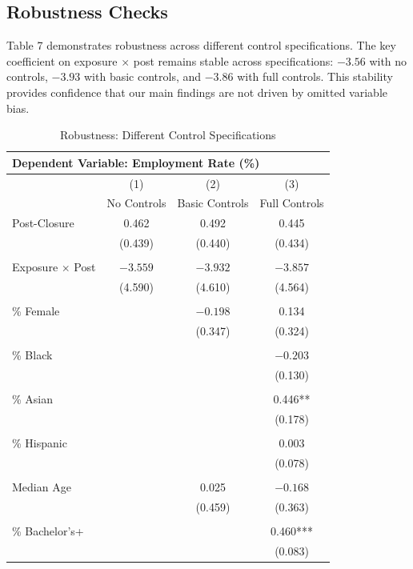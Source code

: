 \documentclass[12pt]{article}
\begin{document}
\clearpage

\subsection{Robustness Checks}

Table 7 demonstrates robustness across different control specifications. The key coefficient on exposure $\times$ post remains stable across specifications: $-3.56$ with no controls, $-3.93$ with basic controls, and $-3.86$ with full controls. This stability provides confidence that our main findings are not driven by omitted variable bias.

\begin{table}[H]
\centering
\caption{Robustness: Different Control Specifications}
\label{tab:robust}
\small
\begin{tabular}{lccc}
\toprule
\multicolumn{4}{l}{Dependent Variable: Employment Rate (\%)} \\
\midrule
& (1) & (2) & (3) \\
& No Controls & Basic Controls & Full Controls \\
\midrule
Post-Closure & 0.462 & 0.492 & 0.445 \\
& (0.439) & (0.440) & (0.434) \\
& & & \\
Exposure $\times$ Post & $-3.559$ & $-3.932$ & $-3.857$ \\
& (4.590) & (4.610) & (4.564) \\
& & & \\
\% Female & & $-0.198$ & 0.134 \\
& & (0.347) & (0.324) \\
& & & \\
\% Black & & & $-0.203$ \\
& & & (0.130) \\
& & & \\
\% Asian & & & 0.446** \\
& & & (0.178) \\
& & & \\
\% Hispanic & & & 0.003 \\
& & & (0.078) \\
& & & \\
Median Age & & 0.025 & $-0.168$ \\
& & (0.459) & (0.363) \\
& & & \\
\% Bachelor's+ & & & 0.460*** \\
& & & (0.083) \\

\end{tabular}
\end{table}
\end{document}
